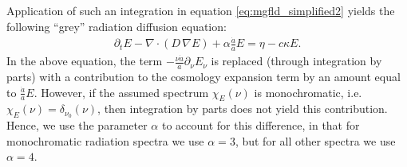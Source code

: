 \documentclass[10pt]{article}
\renewcommand{\(}{\left(}
\renewcommand{\)}{\right)}
\newcommand{\adot}{\dot{a}}
\newcommand{\Enu}{E_{\nu}}
\begin{document}
Application of such an integration in equation
\eqref{eq:mgfld_simplified2} yields the following ``grey'' 
radiation diffusion equation:
\begin{align}
  \label{eq:mgfld_grey}
  \partial_{t} E - \nabla\cdot\(D\,\nabla E\)
    + \alpha\frac{\adot}{a} E = \eta - c\kappa E.
\end{align}
In the above equation, the term 
$-\frac{\nu \adot}{a}\partial_{\nu}\Enu$ is replaced (through
integration by parts) with a contribution to the cosmology expansion
term by an amount equal to $\frac{\adot}{a} E$.  However, if the
assumed spectrum $\chi_E(\nu)$ is monochromatic, i.e. $\chi_E(\nu) =
\delta_{\nu_0}(\nu)$, then integration by parts does not yield this
contribution.  Hence, we use the parameter $\alpha$ to account for
this difference, in that for monochromatic radiation spectra we use
$\alpha=3$, but for all other spectra we use $\alpha=4$.
\end{document}
